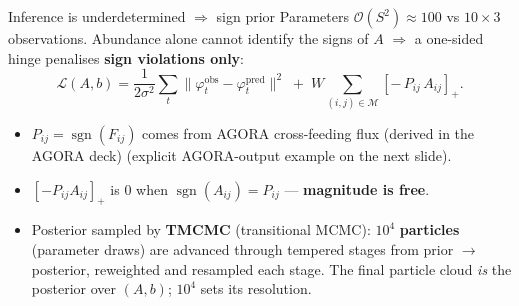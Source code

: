\documentclass[
  ignorenonframetext,
  aspectratio=169,
]{beamer}
\providecommand{\tightlist}{%
  \setlength{\itemsep}{0pt}\setlength{\parskip}{0pt}}
\begin{document}
\begin{frame}{Inference is underdetermined \(\Rightarrow\) sign prior}
\protect\hypertarget{inference-is-underdetermined-rightarrow-sign-prior}{}
Parameters \(\mathcal{O}(S^2)\approx100\) vs \(10\times3\) observations.
Abundance alone cannot identify the signs of \(A\) \(\Rightarrow\) a
one-sided hinge penalises \textbf{sign violations only}:
\[\mathcal{L}(A,b)=\frac{1}{2\sigma^{2}}\sum_{t}\big\lVert\varphi^{\text{obs}}_{t}-\varphi^{\text{pred}}_{t}\big\rVert^{2}
\;+\; W\!\!\sum_{(i,j)\in\mathcal{M}}\!\!\left[-\,P_{ij}\,A_{ij}\right]_{+} .\]

\begin{itemize}
\tightlist
\item
  \(P_{ij}=\operatorname{sgn}(F_{ij})\) comes from AGORA cross-feeding
  flux (derived in the AGORA deck) (explicit AGORA-output example on the
  next slide).
\item
  \(\left[-P_{ij}A_{ij}\right]_{+}\) is \(0\) when
  \(\operatorname{sgn}(A_{ij})=P_{ij}\) --- \textbf{magnitude is free}.
\item
  Posterior sampled by \textbf{TMCMC} (transitional MCMC): \(10^{4}\)
  \textbf{particles} (parameter draws) are advanced through tempered
  stages from prior \(\to\) posterior, reweighted and resampled each
  stage. The final particle cloud \emph{is} the posterior over
  \((A,b)\); \(10^{4}\) sets its resolution.
\end{itemize}
\end{frame}
\end{document}
